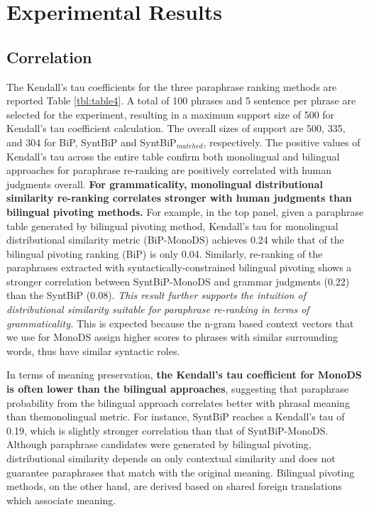 \documentclass[11pt]{article}
\newcommand{\mnote}[1]{\marginpar{\raggedleft\footnotesize\itshape#1}}
\begin{document}
\section{Experimental Results}
\label{sect:results_fr_en}

\subsection{Correlation}
The Kendall's tau coefficients for the three paraphrase ranking methods are reported Table \ref{tbl:table4}. A total of 100 phrases and 5 sentence per phrase are selected for the experiment, resulting in a maximum support size of 500 for Kendall's tau coefficient calculation. The overall sizes of support are 500, 335, and 304 for BiP, SyntBiP and SyntBiP$_{matched}$, respectively. The positive values of Kendall's tau across the entire table confirm both monolingual and bilingual approaches for paraphrase re-ranking are positively correlated with human judgments overall. \textbf{For grammaticality, monolingual distributional similarity re-ranking correlates stronger with human judgments than bilingual pivoting methods.} For example, in the top panel, given a paraphrase table generated by bilingual pivoting method, Kendall's tau for monolingual distributional similarity metric (BiP-MonoDS) achieves 0.24 while that of the bilingual pivoting ranking (BiP) is only 0.04. Similarly, re-ranking of the paraphrases extracted with syntactically-constrained bilingual pivoting shows a stronger correlation between SyntBiP-MonoDS and grammar judgments (0.22) than the SyntBiP (0.08). \mnote{cut this sentence?}\emph{This result further supports the intuition of distributional similarity suitable for paraphrase re-ranking in terms of grammaticality.} This is expected because the %
n-gram based context vectors that we use for MonoDS assign higher scores to phrases with similar surrounding words, thus have similar syntactic roles.

In terms of meaning preservation, \textbf{the Kendall's tau coefficient for MonoDS is often lower than the bilingual approaches}, suggesting that paraphrase probability from the bilingual approach correlates better with phrasal meaning than themonolingual metric. For instance, SyntBiP reaches a Kendall's tau of 0.19, which is slightly stronger correlation than that of SyntBiP-MonoDS. Although paraphrase candidates were generated by bilingual pivoting, distributional similarity depends on only contextual similarity and does not guarantee paraphrases that match with the original meaning. Bilingual pivoting methods, on the other hand, are derived based on %
shared foreign translations which associate meaning. 
\end{document}
